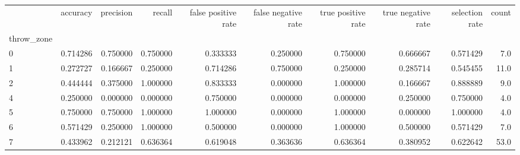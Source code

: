 \begin{tabular}{lrrrrrrrrr}
\toprule
{} &  accuracy &  precision &    recall &  false positive rate &  false negative rate &  true positive rate &  true negative rate &  selection rate &  count \\
throw\_zone &           &            &           &                      &                      &                     &                     &                 &        \\
\midrule
0          &  0.714286 &   0.750000 &  0.750000 &             0.333333 &             0.250000 &            0.750000 &            0.666667 &        0.571429 &    7.0 \\
1          &  0.272727 &   0.166667 &  0.250000 &             0.714286 &             0.750000 &            0.250000 &            0.285714 &        0.545455 &   11.0 \\
2          &  0.444444 &   0.375000 &  1.000000 &             0.833333 &             0.000000 &            1.000000 &            0.166667 &        0.888889 &    9.0 \\
4          &  0.250000 &   0.000000 &  0.000000 &             0.750000 &             0.000000 &            0.000000 &            0.250000 &        0.750000 &    4.0 \\
5          &  0.750000 &   0.750000 &  1.000000 &             1.000000 &             0.000000 &            1.000000 &            0.000000 &        1.000000 &    4.0 \\
6          &  0.571429 &   0.250000 &  1.000000 &             0.500000 &             0.000000 &            1.000000 &            0.500000 &        0.571429 &    7.0 \\
7          &  0.433962 &   0.212121 &  0.636364 &             0.619048 &             0.363636 &            0.636364 &            0.380952 &        0.622642 &   53.0 \\
\bottomrule
\end{tabular}
